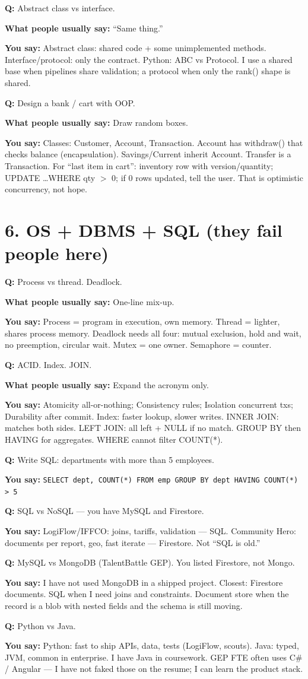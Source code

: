 \documentclass[a4paper,9.5pt]{extarticle}
\newcommand{\Q}[1]{\par\vspace{1.5pt}\noindent\textcolor{hot}{\textbf{Q:} #1}\par}
\newcommand{\Typ}[1]{\noindent\textcolor{muted}{\textbf{What people usually say:} #1}\par}
\newcommand{\Say}[1]{\noindent\textcolor{ok}{\textbf{You say:} #1}\par}
\begin{document}
\Q{Abstract class vs interface.}
\Typ{``Same thing.''}
\Say{Abstract class: shared code + some unimplemented methods. Interface/protocol: only the contract. Python: ABC vs Protocol. I use a shared base when pipelines share validation; a protocol when only the rank() shape is shared.}

\Q{Design a bank / cart with OOP.}
\Typ{Draw random boxes.}
\Say{Classes: Customer, Account, Transaction. Account has withdraw() that checks balance (encapsulation). Savings/Current inherit Account. Transfer is a Transaction. For ``last item in cart'': inventory row with version/quantity; UPDATE \ldots WHERE qty $>$ 0; if 0 rows updated, tell the user. That is optimistic concurrency, not hope.}

\section{6. OS + DBMS + SQL (they fail people here)}
\Q{Process vs thread. Deadlock.}
\Typ{One-line mix-up.}
\Say{Process = program in execution, own memory. Thread = lighter, shares process memory. Deadlock needs all four: mutual exclusion, hold and wait, no preemption, circular wait. Mutex = one owner. Semaphore = counter.}

\Q{ACID. Index. JOIN.}
\Typ{Expand the acronym only.}
\Say{Atomicity all-or-nothing; Consistency rules; Isolation concurrent txs; Durability after commit. Index: faster lookup, slower writes. INNER JOIN: matches both sides. LEFT JOIN: all left + NULL if no match. GROUP BY then HAVING for aggregates. WHERE cannot filter COUNT(*).}

\Q{Write SQL: departments with more than 5 employees.}
\Say{\texttt{SELECT dept, COUNT(*) FROM emp GROUP BY dept HAVING COUNT(*) > 5}}

\Q{SQL vs NoSQL --- you have MySQL and Firestore.}
\Say{LogiFlow/IFFCO: joins, tariffs, validation --- SQL. Community Hero: documents per report, geo, fast iterate --- Firestore. Not ``SQL is old.''}

\Q{MySQL vs MongoDB (TalentBattle GEP). You listed Firestore, not Mongo.}
\Say{I have not used MongoDB in a shipped project. Closest: Firestore documents. SQL when I need joins and constraints. Document store when the record is a blob with nested fields and the schema is still moving.}

\Q{Python vs Java.}
\Say{Python: fast to ship APIs, data, tests (LogiFlow, scouts). Java: typed, JVM, common in enterprise. I have Java in coursework. GEP FTE often uses C\# / Angular --- I have not faked those on the resume; I can learn the product stack.}
\end{document}
